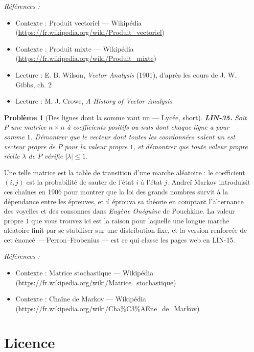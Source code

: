 \documentclass[11pt]{article}
\newtheorem{problem}{Problème}
\newenvironment{refs}{\par\small\noindent\emph{Références :}\begin{itemize}\setlength\itemsep{0pt}}{\end{itemize}\normalsize}
\begin{document}
\begin{refs}
\item Contexte : Produit vectoriel --- Wikipédia (\url{https://fr.wikipedia.org/wiki/Produit_vectoriel})
\item Contexte : Produit mixte --- Wikipédia (\url{https://fr.wikipedia.org/wiki/Produit_mixte})
\item Lecture : E. B. Wilson, \textit{Vector Analysis} (1901), d'après les cours de J. W. Gibbs, ch. 2
\item Lecture : M. J. Crowe, \textit{A History of Vector Analysis}
\end{refs}

\bigskip

\begin{problem}[{Des lignes dont la somme vaut un --- Lycée, short}]
\textbf{LIN-35.} Soit $P$ une matrice $n \times n$ à coefficients positifs
ou nuls dont chaque ligne a pour somme $1$. Démontrer que le vecteur dont toutes les coordonnées
valent un est vecteur propre de $P$ pour la valeur propre $1$, et démontrer que toute valeur
propre réelle $\lambda$ de $P$ vérifie $|\lambda| \le 1$.
\end{problem}

\noindent Une telle matrice est la table de transition d'une marche aléatoire : le
coefficient $(i,j)$ est la probabilité de sauter de l'état $i$ à l'état $j$. Andreï Markov
introduisit ces chaînes en 1906 pour montrer que la loi des grands nombres survit à la dépendance
entre les épreuves, et il éprouva sa théorie en comptant l'alternance des voyelles et des consonnes
dans \textit{Eugène Onéguine} de Pouchkine. La valeur propre $1$ que vous trouvez ici est la raison
pour laquelle une longue marche aléatoire finit par se stabiliser sur une distribution fixe, et la
version renforcée de cet énoncé --- Perron--Frobenius --- est ce qui classe les pages web en LIN-15.

\begin{refs}
\item Contexte : Matrice stochastique --- Wikipédia (\url{https://fr.wikipedia.org/wiki/Matrice_stochastique})
\item Contexte : Chaîne de Markov --- Wikipédia (\url{https://fr.wikipedia.org/wiki/Cha%C3%AEne_de_Markov})
\end{refs}

\bigskip


\section*{Licence}
\end{document}

